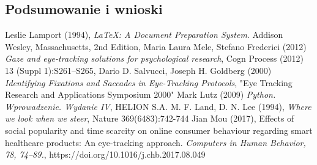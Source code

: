 \documentclass[12pt,a4paper,twoside,openright,titlepage]{report}
\begin{document}
\begin{large}
        \chapter{Podsumowanie i wnioski}
            \blindtext
        \begin{thebibliography}{9}
                Leslie Lamport (1994),
                \emph{\LaTeX: A Document Preparation System}.
                Addison Wesley, Massachusetts,
                2nd Edition,
                Maria Laura Mele, Stefano Frederici (2012)
                \emph{Gaze and eye-tracking solutions for psychological research},
                Cogn Process (2012) 13 (Suppl 1):S261–S265,
                Dario D. Salvucci, Joseph H. Goldberg (2000)
                \emph{Identifying Fixations and Saccades in Eye-Tracking Protocols},
                "Eye Tracking Research and Applications Symposium 2000"
                Mark Lutz (2009)
                \emph{Python. Wprowadzenie. Wydanie IV},
                HELION S.A.
                M. F. Land, D. N. Lee (1994),
                \emph{Where we look when we steer},
                Nature 369(6483):742-744
                Jian Mou (2017),
                Effects of social popularity and time scarcity on online consumer behaviour regarding smart healthcare products: An eye-tracking approach. \emph{Computers in Human Behavior, 78, 74–89.},
                https://doi.org/10.1016/j.chb.2017.08.049
        \end{thebibliography}
    \end{large}
\end{document}
